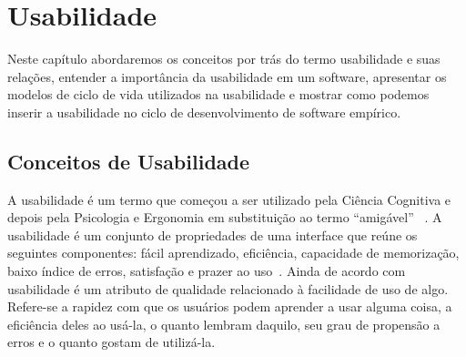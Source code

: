 \chapter{Usabilidade}

Neste capítulo abordaremos os conceitos por trás do termo usabilidade e suas  relações, entender a importância da usabilidade em um software, apresentar os modelos de ciclo de vida utilizados na usabilidade e mostrar como podemos inserir a usabilidade no ciclo de desenvolvimento de software empírico.

\section{Conceitos de Usabilidade}

A usabilidade é um termo que começou a ser utilizado pela Ciência Cognitiva e depois pela Psicologia e Ergonomia em substituição ao termo ``amigável'' ~\cite{dias2006}.
% 
A usabilidade é um conjunto de propriedades de uma interface que reúne os seguintes componentes: fácil aprendizado, eficiência, capacidade de memorização, baixo índice de erros, satisfação e prazer ao uso~\cite{nielsen1994}.
%
Ainda de acordo com  usabilidade é um atributo de qualidade relacionado à facilidade de uso de algo. Refere-se a rapidez com que os usuários podem aprender a usar alguma coisa, a eficiência deles ao usá-la, o quanto lembram daquilo, seu grau de propensão a erros e o quanto gostam de utilizá-la. 
%

